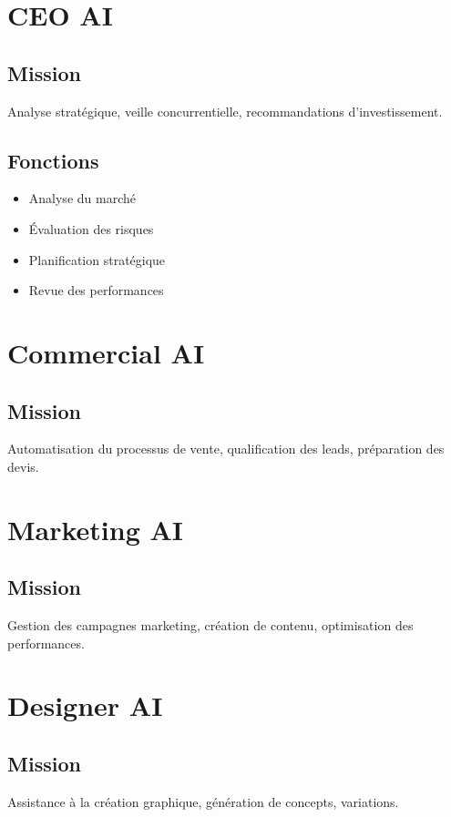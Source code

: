 \documentclass[12pt,a4paper,oneside]{book}
\begin{document}
\chapter{CEO AI}

\section{Mission}
Analyse stratégique, veille concurrentielle, recommandations d'investissement.

\section{Fonctions}
\begin{itemize}
\item Analyse du marché
\item Évaluation des risques
\item Planification stratégique
\item Revue des performances
\end{itemize}

\chapter{Commercial AI}

\section{Mission}
Automatisation du processus de vente, qualification des leads, préparation des devis.

\chapter{Marketing AI}

\section{Mission}
Gestion des campagnes marketing, création de contenu, optimisation des performances.

\chapter{Designer AI}

\section{Mission}
Assistance à la création graphique, génération de concepts, variations.
\end{document}
